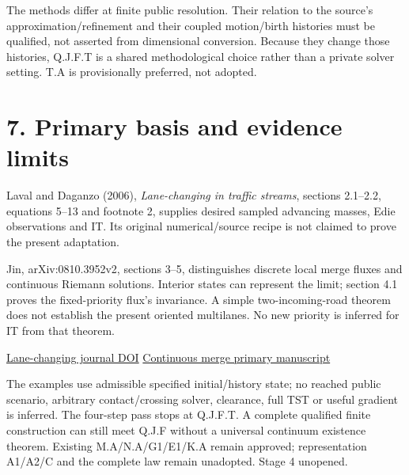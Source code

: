 \documentclass[11pt,a4paper]{article}
\begin{document}
The methods differ at finite public resolution. Their relation to the
source's approximation/refinement and their coupled motion/birth histories
must be qualified, not asserted from dimensional conversion. Because they
change those histories, Q.J.F.T is a shared methodological choice rather
than a private solver setting. T.A is provisionally preferred, not adopted.

\section*{7. Primary basis and evidence limits}
Laval and Daganzo (2006), \emph{Lane-changing in traffic streams},
sections 2.1--2.2, equations 5--13 and footnote 2, supplies desired sampled
advancing masses, Edie observations and IT. Its original numerical/source
recipe is not claimed to prove the present adaptation.

Jin, arXiv:0810.3952v2, sections 3--5, distinguishes discrete local merge
fluxes and continuous Riemann solutions. Interior states can represent the
limit; section 4.1 proves the fixed-priority flux's invariance. A simple
two-incoming-road theorem does not establish the present oriented multilanes.
No new priority is inferred for IT from that theorem.

\href{https://doi.org/10.1016/j.trb.2005.04.003}{Lane-changing journal DOI}
\quad
\href{https://arxiv.org/pdf/0810.3952}{Continuous merge primary manuscript}

The examples use admissible specified initial/history state; no reached
public scenario, arbitrary contact/crossing solver, clearance, full TST or
useful gradient is inferred. The four-step pass stops at Q.J.F.T. A complete
qualified finite construction can still meet Q.J.F without a universal
continuum existence theorem. Existing M.A/N.A/G1/E1/K.A remain approved;
representation A1/A2/C and the complete law remain unadopted. Stage 4 unopened.
\end{document}
